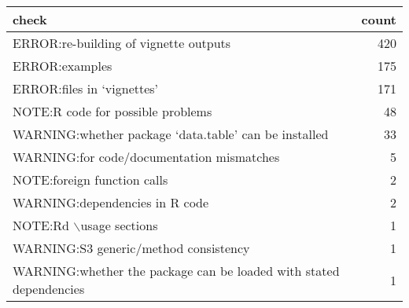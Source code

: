 \begin{tabular}{lr}
  \hline
check & count \\ 
  \hline
ERROR:re-building of vignette outputs & 420 \\ 
  ERROR:examples & 175 \\ 
  ERROR:files in ‘vignettes’ & 171 \\ 
  NOTE:R code for possible problems & 48 \\ 
  WARNING:whether package ‘data.table’ can be installed & 33 \\ 
  WARNING:for code/documentation mismatches &  5 \\ 
  NOTE:foreign function calls &  2 \\ 
  WARNING:dependencies in R code &  2 \\ 
  NOTE:Rd $\backslash$usage sections &  1 \\ 
  WARNING:S3 generic/method consistency &  1 \\ 
  WARNING:whether the package can be loaded with stated dependencies &  1 \\ 
   \hline
\end{tabular}
